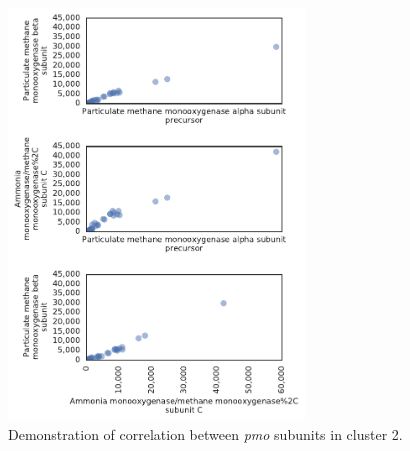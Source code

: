 \begin{figure}[H]
\centering
    \includegraphics[width=0.7\textwidth]{./tex/chapter3/figures/170402_correlations_between_pMMO_subunits--set2.pdf}
    \begin{singlespace}
    \caption[Demonstration of correlation between \textit{pmo} subniuts in cluster 2]{
        Demonstration of correlation between \textit{pmo} subunits in cluster 2.}
    \label{fig:pmo_cor2}
    \end{singlespace}
\end{figure}

